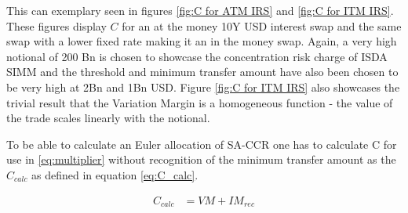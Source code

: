 \documentclass[../Thesis_AHoecherl.tex]{subfiles}
\begin{document}
    This can exemplary seen in figures \ref{fig:C for ATM IRS} and \ref{fig:C for ITM IRS}. These figures display $C$ for an at the money 10Y USD interest swap and the same swap with a lower fixed rate making it an in the money swap. Again, a very high notional of 200 Bn is chosen to showcase the concentration risk charge of ISDA SIMM and the threshold and minimum transfer amount have also been chosen to be very high at 2Bn and 1Bn USD.
    Figure \ref{fig:C for ITM IRS} also showcases the trivial result that the Variation Margin is a homogeneous function - the value of the trade scales linearly with the notional.

    To be able to calculate an Euler allocation of SA-CCR one has to calculate C for use in \ref{eq:multiplier} without recognition of the minimum transfer amount as the $C_{calc}$ as defined in equation \ref{eq:C_calc}.

    \begin{align}
        \label{eq:C_calc}
        C_{calc} &= VM + IM_{rec}
    \end{align}
\end{document}
